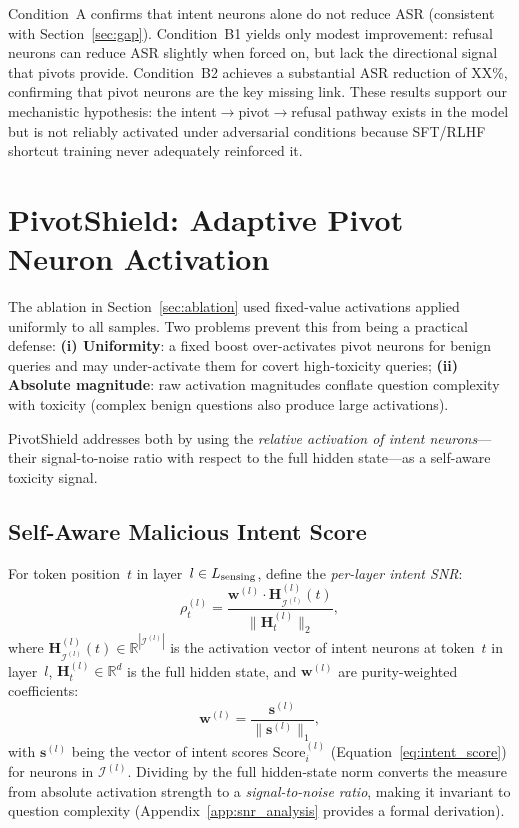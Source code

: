\documentclass{article}
\newcommand{\method}{PivotShield\xspace}
\begin{document}
Condition~A confirms that intent neurons alone do not reduce ASR
(consistent with Section~\ref{sec:gap}).
Condition~B1 yields only modest improvement: refusal neurons can
reduce ASR slightly when forced on, but lack the directional
signal that pivots provide.
Condition~B2 achieves a substantial ASR reduction of XX\%,
confirming that pivot neurons are the key missing link.
These results support our mechanistic hypothesis: the
intent$\to$pivot$\to$refusal pathway exists in the model but is
not reliably activated under adversarial conditions because SFT/RLHF
shortcut training never adequately reinforced it.

\section{\method: Adaptive Pivot Neuron Activation}
\label{sec:method}

The ablation in Section~\ref{sec:ablation} used fixed-value
activations applied uniformly to all samples.
Two problems prevent this from being a practical defense:
\textbf{(i) Uniformity}: a fixed boost over-activates pivot
neurons for benign queries and may under-activate them for
covert high-toxicity queries;
\textbf{(ii) Absolute magnitude}: raw activation magnitudes
conflate question complexity with toxicity (complex benign
questions also produce large activations).

\method addresses both by using the \emph{relative activation of
intent neurons}---their signal-to-noise ratio with respect to the
full hidden state---as a self-aware toxicity signal.

\subsection{Self-Aware Malicious Intent Score}

For token position~$t$ in layer~$l \in L_{\rm sensing}$, define
the \emph{per-layer intent SNR}:
\begin{equation}
  \rho_t^{(l)} =
  \frac{\mathbf{w}^{(l)} \cdot \mathbf{H}_{\mathcal{I}^{(l)}}^{(l)}(t)}
       {\|\mathbf{H}_t^{(l)}\|_2},
  \label{eq:snr}
\end{equation}
where $\mathbf{H}_{\mathcal{I}^{(l)}}^{(l)}(t) \in \mathbb{R}^{|\mathcal{I}^{(l)}|}$
is the activation vector of intent neurons at token~$t$ in layer~$l$,
$\mathbf{H}_t^{(l)} \in \mathbb{R}^{d}$ is the full hidden state,
and $\mathbf{w}^{(l)}$ are purity-weighted coefficients:
\begin{equation}
  \mathbf{w}^{(l)} = \frac{\mathbf{s}^{(l)}}{\|\mathbf{s}^{(l)}\|_1},
  \label{eq:weights}
\end{equation}
with $\mathbf{s}^{(l)}$ being the vector of intent scores
$\mathrm{Score}_i^{(l)}$ (Equation~\ref{eq:intent_score}) for
neurons in $\mathcal{I}^{(l)}$.
Dividing by the full hidden-state norm converts the measure from
absolute activation strength to a \emph{signal-to-noise ratio},
making it invariant to question complexity
(Appendix~\ref{app:snr_analysis} provides a formal derivation).
\end{document}
